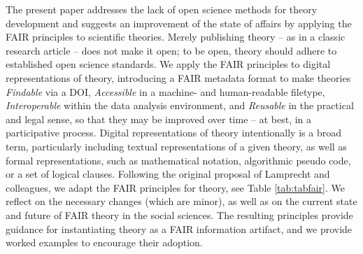 \documentclass[
  man,floatsintext]{apa6}
\begin{document}
The present paper addresses the lack of open science methods for theory development and suggests an improvement of the state of affairs by applying the FAIR principles to scientific theories.
Merely publishing theory -- as in a classic research article -- does not make it open;
to be open, theory should adhere to established open science standards.
We apply the FAIR principles to digital representations of theory,
introducing a FAIR metadata format to make theories \emph{Findable} via a DOI,
\emph{Accessible} in a machine- and human-readable filetype,
\emph{Interoperable} within the data analysis environment,
and \emph{Reusable} in the practical and legal sense, so that they may be improved over time -- at best, in a participative process.
Digital representations of theory intentionally is a broad term, particularly including textual representations of a given theory, as well as formal representations, such as mathematical notation, algorithmic pseudo code, or a set of logical clauses.
Following the original proposal of Lamprecht and colleagues,
we adapt the FAIR principles for theory, see Table \ref{tab:tabfair}.
We reflect on the necessary changes (which are minor),
as well as on the current state and future of FAIR theory in the social sciences.
The resulting principles provide guidance for instantiating theory as a FAIR information artifact,
and we provide worked examples to encourage their adoption.
\end{document}
